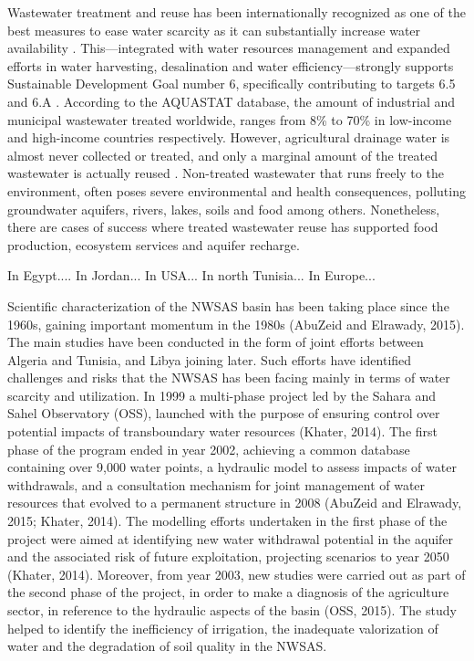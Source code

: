 Wastewater treatment and reuse has been internationally recognized as one of the best measures to ease water scarcity as it can substantially increase water availability \cite{unescoWastewaterUntappedResource2017,GARCIA2015154}. This---integrated with water resources management and expanded efforts in water harvesting, desalination and water efficiency---strongly supports Sustainable Development Goal number 6, specifically contributing to targets 6.5 and 6.A \cite{UNSDGs2019}. According to the AQUASTAT database, the amount of industrial and municipal wastewater treated worldwide, ranges from 8\% to 70\% in low-income and high-income countries respectively. However, agricultural drainage water is almost never collected or treated, and only a marginal amount of the treated wastewater is actually reused \cite{unescoWastewaterUntappedResource2017}. Non-treated wastewater that runs freely to the environment, often poses severe environmental and health consequences, polluting groundwater aquifers, rivers, lakes, soils and food among others. Nonetheless, there are cases of success where treated wastewater reuse has supported food production, ecosystem services and aquifer recharge.

In Egypt....
In Jordan...
In USA...
In north Tunisia...
In Europe...

Scientific characterization of the NWSAS basin has been taking place since the 1960s, gaining important momentum in the 1980s (AbuZeid and Elrawady, 2015). The main studies have been conducted in the form of joint efforts between Algeria and Tunisia, and Libya joining later. Such efforts have identified challenges and risks that the NWSAS has been facing mainly in terms of water scarcity and utilization. In 1999 a multi-phase project led by the Sahara and Sahel Observatory (OSS), launched with the purpose of ensuring control over potential impacts of transboundary water resources (Khater, 2014). The first phase of the program ended in year 2002, achieving a common database containing over 9,000 water points, a hydraulic model to assess impacts of water withdrawals, and a consultation mechanism for joint management of water resources that evolved to a permanent structure in 2008 (AbuZeid and Elrawady, 2015; Khater, 2014). The modelling efforts undertaken in the first phase of the project were aimed at identifying new water withdrawal potential in the aquifer and the associated risk of future exploitation, projecting scenarios to year 2050 (Khater, 2014). Moreover, from year 2003, new studies were carried out as part of the second phase of the project, in order to make a diagnosis of the agriculture sector, in reference to the hydraulic aspects of the basin (OSS, 2015). The study helped to identify the inefficiency of irrigation, the inadequate valorization of water and the degradation of soil quality in the NWSAS.

